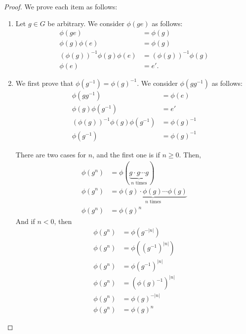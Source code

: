     \begin{proof}
        We prove each item as follows:
        \begin{enumerate}
            \item Let \(g\in G\) be arbitrary. We consider \(\phi(ge)\) as follows:
            \begin{align*}
                \phi(ge) &= \phi(g) \\
                \phi(g)\phi(e) &= \phi(g) \\
                \left(\phi(g)\right)^{-1}\phi(g)\phi(e) &= \left(\phi(g)\right)^{-1}\phi(g) \\
                \phi(e) &= e'.
            \end{align*}

            \item We first prove that \(\phi(g^{-1}) = \phi(g)^{-1}\). We consider \(\phi(gg^{-1})\) as follows:
            \begin{align*}
                \phi(gg^{-1}) &= \phi(e) \\
                \phi(g)\phi(g^{-1}) &= e' \\
                \left(\phi(g)\right)^{-1}\phi(g)\phi(g^{-1}) &= \phi(g)^{-1} \\
                \phi(g^{-1}) &= \phi(g)^{-1}
            \end{align*}

            There are two cases for \(n\), and the first one is if \(n \geq 0\). Then,
            \begin{align*}
                \phi(g^n) &= \phi(\underbrace{g\cdot g \cdots g}_{n \text{ times}}) \\
                \phi(g^n) &= \underbrace{\phi(g) \cdot \phi(g) \cdots \phi(g)}_{n \text{ times}} \\
                \phi(g^n) &= \phi(g)^n
            \end{align*}
            And if \(n < 0\), then
            \begin{align*}
                \phi(g^n) &= \phi(g^{-|n|}) \\
                \phi(g^n) &= \phi((g^{-1})^{|n|}) \\
                \phi(g^n) &= \phi(g^{-1})^{|n|} \\
                \phi(g^n) &= (\phi(g)^{-1})^{|n|} \\
                \phi(g^n) &= \phi(g)^{-|n|} \\
                \phi(g^n) &= \phi(g)^{n}
            \end{align*}


\end{enumerate}
\end{proof}
